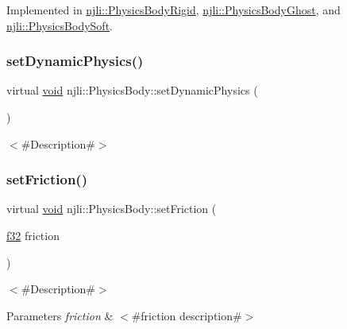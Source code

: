 Implemented in \mbox{\hyperlink{classnjli_1_1_physics_body_rigid_a772e64b569e190f647047c0c5be2a852}{njli\+::\+Physics\+Body\+Rigid}}, \mbox{\hyperlink{classnjli_1_1_physics_body_ghost_a87c4ba0c2317a6e6e40231f58a1c9ed5}{njli\+::\+Physics\+Body\+Ghost}}, and \mbox{\hyperlink{classnjli_1_1_physics_body_soft_ac84a68c18afab8bf7cabdf51461d52fb}{njli\+::\+Physics\+Body\+Soft}}.

\mbox{\label{classnjli_1_1_physics_body_a507e920a3e95896173545a631325f52a}} 
\subsubsection{\texorpdfstring{set\+Dynamic\+Physics()}{setDynamicPhysics()}}
{\footnotesize\ttfamily virtual \mbox{\hyperlink{_thread_8h_af1e856da2e658414cb2456cb6f7ebc66}{void}} njli\+::\+Physics\+Body\+::set\+Dynamic\+Physics (\begin{DoxyParamCaption}{ }\end{DoxyParamCaption})\hspace{0.3cm}{\ttfamily [virtual]}}

$<$\#\+Description\#$>$ \mbox{\label{classnjli_1_1_physics_body_aa274a01209a062b130d675bec9aef6ed}} 
\subsubsection{\texorpdfstring{set\+Friction()}{setFriction()}}
{\footnotesize\ttfamily virtual \mbox{\hyperlink{_thread_8h_af1e856da2e658414cb2456cb6f7ebc66}{void}} njli\+::\+Physics\+Body\+::set\+Friction (\begin{DoxyParamCaption}\item[{\mbox{\hyperlink{_util_8h_a5f6906312a689f27d70e9d086649d3fd}{f32}}}]{friction }\end{DoxyParamCaption})\hspace{0.3cm}{\ttfamily [virtual]}}

$<$\#\+Description\#$>$


\begin{DoxyParams}{Parameters}
{\em friction} & $<$\#friction description\#$>$ \\
\hline
\end{DoxyParams}
\mbox{\label{classnjli_1_1_physics_body_ab7747d6463f3bc09b0834f51b3e0d3ee}} 
